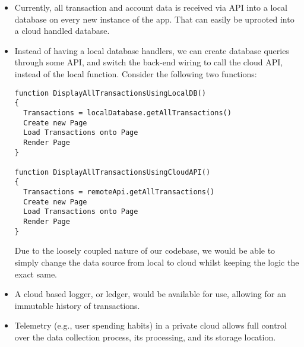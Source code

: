 \documentclass{article}
\begin{document}
	\begin{itemize}
		\item Currently, all transaction and account data is received via API into a local database on every new instance of the app. That can easily be uprooted into a cloud handled database. 
		\item Instead of having a local database handlers, we can create database queries through some API, and switch the back-end wiring to call the cloud API, instead of the local function. Consider the following two functions:
		\begin{lstlisting}
function DisplayAllTransactionsUsingLocalDB() 
{
  Transactions = localDatabase.getAllTransactions()
  Create new Page
  Load Transactions onto Page
  Render Page
}

function DisplayAllTransactionsUsingCloudAPI() 
{
  Transactions = remoteApi.getAllTransactions()
  Create new Page
  Load Transactions onto Page
  Render Page
}
\end{lstlisting}
	Due to the loosely coupled nature of our codebase, we would be able to simply change the data source from local to cloud whilst keeping the logic the exact same.
	\item A cloud based logger, or ledger, would be available for use, allowing for an immutable history of transactions.
	\item Telemetry (e.g., user spending habits) in a private cloud allows full control over the data collection process, its processing, and its storage location.
	\end{itemize}

	
\end{document}
